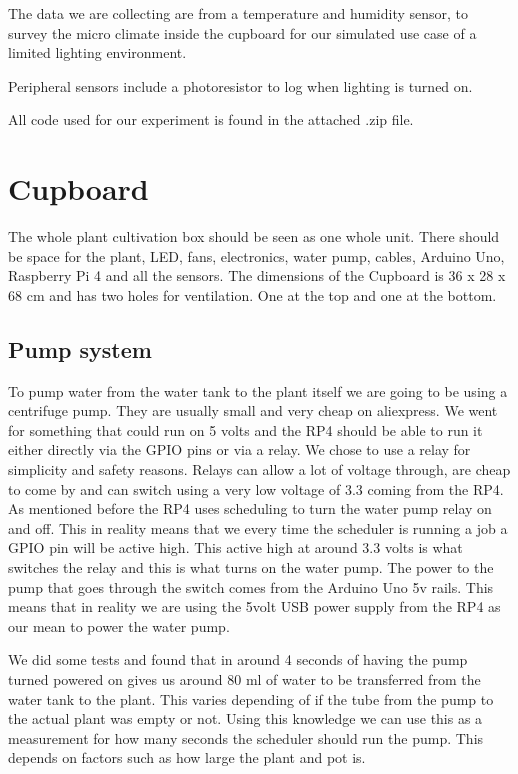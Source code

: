 \documentclass[a4paper,12pt,twoside,openright,titlepage]{book}
\begin{document}
The data we are collecting are from a temperature and humidity sensor, to survey the micro climate inside the cupboard for our simulated use case of a limited lighting environment.

Peripheral sensors include a photoresistor to log when lighting is turned on.

All code used for our experiment is found in the attached .zip file.

\section{Cupboard}

The whole plant cultivation box should be seen as one whole unit. There should be space for the plant, LED, fans, electronics, water pump, cables, Arduino Uno, Raspberry Pi 4 and all the sensors.
The dimensions of the Cupboard is 36 x 28 x 68 cm and has two holes for ventilation. One at the top and one at the bottom.

\subsection{Pump system}
To pump water from the water tank to the plant itself we are going to be using a centrifuge pump. They are usually small and very cheap on aliexpress. We went for something that could run on 5 volts and the RP4 should be able to run it either directly via the GPIO pins or via a relay.
We chose to use a relay for simplicity and safety reasons. Relays can allow a lot of voltage through, are cheap to come by and can switch using a very low voltage of 3.3 coming from the RP4.
As mentioned before the RP4 uses scheduling to turn the water pump relay on and off. This in reality means that we every time the scheduler is running a job a GPIO pin will be active high. This active high at around 3.3 volts is what switches the relay and this is what turns on the water pump. The power to the pump that goes through the switch comes from the Arduino Uno 5v rails. This means that in reality we are using the 5volt USB power supply from the RP4 as our mean to power the water pump.

We did some tests and found that in around 4 seconds of having the pump turned powered on gives us  around 80 ml of water to be transferred from the water tank to the plant. This varies depending of if the tube from the pump to the actual plant was empty or not.
Using this knowledge we can use this as a measurement for how many seconds the scheduler should run the pump. This depends on factors such as how large the plant and pot is.
\end{document}
